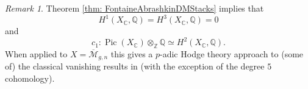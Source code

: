 \documentclass{amsart}
\newtheorem{prop}{Proposition}[section]
\newtheorem{lem}[prop]{Lemma}
\theoremstyle{definition}
\theoremstyle{remark}
\newtheorem{remark}[prop]{Remark}
\DeclareMathOperator{\Gal}{Gal}
\DeclareMathOperator{\Pic}{Pic}
\newcommand{\Q}{\mathbb{Q}}
\newcommand{\Qp}{\mathbb {Q}_p}
\newcommand{\ZZ}{\mathbb Z}
\newcommand{\et}{\operatorname{\acute{e}t}}%
\begin{document}

\begin{remark}
    Theorem \ref{thm: FontaineAbrashkinDMStacks} implies that
    $$
        H^{1}(X_{\mathbb{C}},\mathbb{Q})=H^{3}(X_{\mathbb{C}},\mathbb{Q})=0
    $$
    and 
    $$
        c_{1}\colon \Pic(X_{\mathbb{C}})\otimes_{\ZZ}\mathbb{Q}\simeq H^{2}(X_{\mathbb{C}},\mathbb{Q}).
    $$
    When applied to $X=\overline{\mathcal{M}}_{g,n}$ this gives a $p$-adic Hodge theory approach to (some of) the classical vanishing results in \cite{Arbarello-CornalbaCohomology} (with the exception of the degree $5$ cohomology).
\end{remark}
\end{document}
